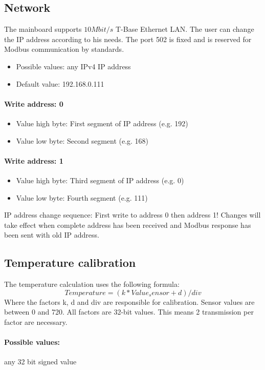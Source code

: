 \subsection{Network}
The mainboard supports $10 Mbit/s$ T-Base Ethernet LAN. The user can change the IP address according to his needs. The port 502 is fixed and is reserved for Modbus communication by standards.

\begin{itemize}
    \item Possible values: any IPv4 IP address
    \item Default value: 192.168.0.111
\end{itemize}

\paragraph{Write address: 0} 
\begin{itemize}
    \item Value high byte: First segment of IP address (e.g. 192)
    \item Value low byte: Second segment (e.g. 168)
\end{itemize}

\paragraph{Write address: 1} 
\begin{itemize}
    \item Value high byte: Third segment of IP address (e.g. 0)
    \item  Value low byte: Fourth segment (e.g. 111)
\end{itemize}

IP address change sequence: First write to address 0 then address 1! Changes will take effect when complete address has been received and Modbus response has been sent with old IP address.

\subsection{Temperature calibration}
The temperature calculation uses the following formula:
\[
Temperature = (k * Value_sensor + d) / div
\]
Where the factors k, d and div are responsible for calibration. Sensor values are between 0 and 720. All factors are 32-bit values. This means 2 transmission per factor are necessary.

\paragraph{Possible values:} any 32 bit signed value

